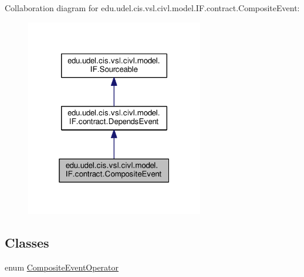 Collaboration diagram for edu.\+udel.\+cis.\+vsl.\+civl.\+model.\+I\+F.\+contract.\+Composite\+Event\+:
\nopagebreak
\begin{figure}[H]
\begin{center}
\leavevmode
\includegraphics[width=220pt]{interfaceedu_1_1udel_1_1cis_1_1vsl_1_1civl_1_1model_1_1IF_1_1contract_1_1CompositeEvent__coll__graph}
\end{center}
\end{figure}
\subsection*{Classes}
\begin{DoxyCompactItemize}
\item 
enum \hyperlink{enumedu_1_1udel_1_1cis_1_1vsl_1_1civl_1_1model_1_1IF_1_1contract_1_1CompositeEvent_1_1CompositeEventOperator}{Composite\+Event\+Operator}
\end{DoxyCompactItemize}
